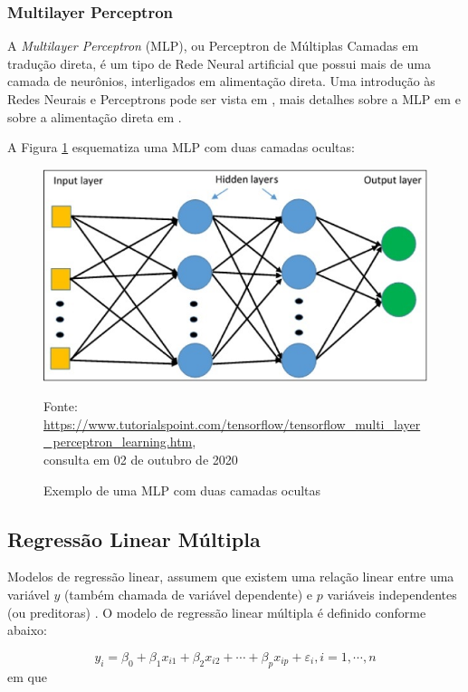 \documentclass[12pt]{article}
\begin{document}
\subsubsection{Multilayer Perceptron}

A \textit{Multilayer Perceptron} (MLP), ou Perceptron de Múltiplas Camadas em tradução
direta, é um tipo de Rede Neural artificial que possui mais de uma camada de 
neurônios, interligados em alimentação direta. Uma introdução às Redes Neurais e
Perceptrons pode ser vista em \cite{bailer2001introduction}, mais detalhes sobre
a MLP em \cite{sarle1994neural} e sobre a alimentação direta em 
\cite{bishop1995neural}.

A Figura \ref{fig:mlp} esquematiza uma MLP com duas camadas ocultas:

\begin{figure}[ht]
  \centering
  \includegraphics[scale=0.6]{img/multi_layer_perceptron.jpg}
  \caption{
    Exemplo de uma MLP com duas camadas ocultas
  }
  Fonte: \url{https://www.tutorialspoint.com/tensorflow/tensorflow_multi_layer_perceptron_learning.htm}, 
  \\consulta em 02 de outubro de 2020
  \label{fig:mlp}
\end{figure}

\subsection{Regressão Linear Múltipla}

Modelos de regressão linear, assumem que existem uma relação linear entre uma 
variável $y$ (também chamada de variável dependente) e $p$ variáveis independentes
(ou preditoras) \cite{rodrigues2012modelo}. O modelo de regressão linear múltipla é definido 
conforme abaixo:

\begin{equation}
  y_i = \beta_0 + \beta_1x_{i1} + \beta_2x_{i2} + \cdots + \beta_px_{ip} + 
  \varepsilon_i, i = 1, \cdots, n
\end{equation}
em que
\end{document}
